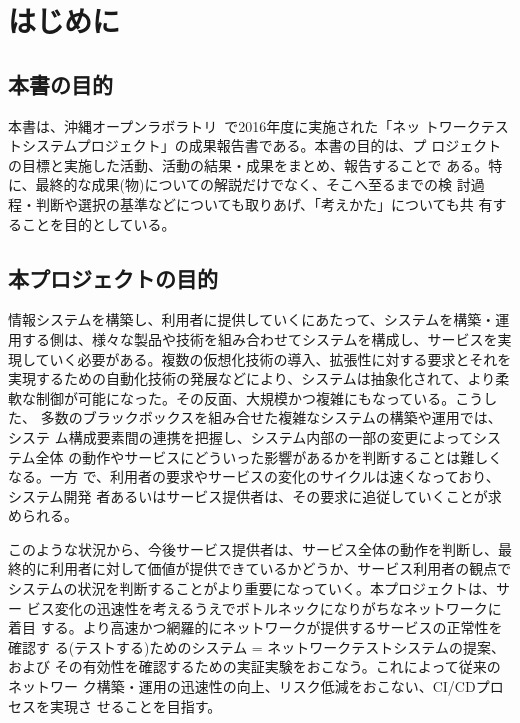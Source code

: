 
\chapter{はじめに}
\label{chap:abstract}

 \section{本書の目的}
 \label{sec:book-purpose}

本書は、沖縄オープンラボラトリ~\cite{ool-web}で2016年度に実施された「ネッ
トワークテストシステムプロジェクト」の成果報告書である。本書の目的は、プ
ロジェクトの目標と実施した活動、活動の結果・成果をまとめ、報告することで
ある。特に、最終的な成果(物)についての解説だけでなく、そこへ至るまでの検
討過程・判断や選択の基準などについても取りあげ、「考えかた」についても共
有することを目的としている。

 \section{本プロジェクトの目的}
 \label{sec:pj-purpose}


情報システムを構築し、利用者に提供していくにあたって、システムを構築・運
用する側は、様々な製品や技術を組み合わせてシステムを構成し、サービスを実
現していく必要がある。複数の仮想化技術の導入、拡張性に対する要求とそれを
実現するための自動化技術の発展などにより、システムは抽象化されて、より柔
軟な制御が可能になった。その反面、大規模かつ複雑にもなっている。こうした、
多数のブラックボックスを組み合せた複雑なシステムの構築や運用では、システ
ム構成要素間の連携を把握し、システム内部の一部の変更によってシステム全体
の動作やサービスにどういった影響があるかを判断することは難しくなる。一方
で、利用者の要求やサービスの変化のサイクルは速くなっており、システム開発
者あるいはサービス提供者は、その要求に追従していくことが求められる。

このような状況から、今後サービス提供者は、サービス全体の動作を判断し、最
終的に利用者に対して価値が提供できているかどうか、サービス利用者の観点で
システムの状況を判断することがより重要になっていく。本プロジェクトは、サー
ビス変化の迅速性を考えるうえでボトルネックになりがちなネットワークに着目
する。より高速かつ網羅的にネットワークが提供するサービスの正常性を確認す
る(テストする)ためのシステム = ネットワークテストシステムの提案、および
その有効性を確認するための実証実験をおこなう。これによって従来のネットワー
ク構築・運用の迅速性の向上、リスク低減をおこない、CI/CDプロセスを実現さ
せることを目指す。

